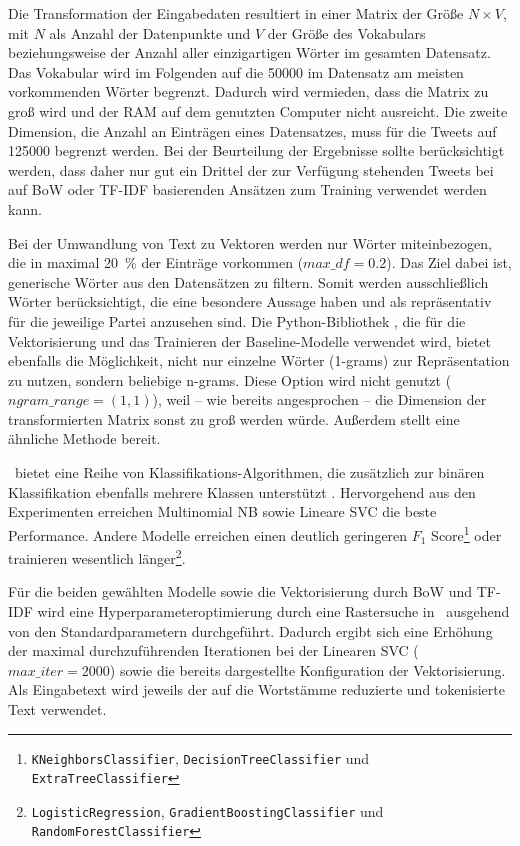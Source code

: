 Die Transformation der Eingabedaten resultiert in einer Matrix der Größe \(N \times V\), mit \(N\) als Anzahl der Datenpunkte und \(V\) der Größe des Vokabulars beziehungsweise der Anzahl aller einzigartigen Wörter im gesamten Datensatz. Das Vokabular wird im Folgenden auf die \num{50000} im Datensatz am meisten vorkommenden Wörter begrenzt. Dadurch wird vermieden, dass die Matrix zu groß wird und der \ac{RAM} auf dem genutzten Computer nicht ausreicht. Die zweite Dimension, die Anzahl an Einträgen eines Datensatzes, muss für die Tweets auf \num{125000} begrenzt werden. Bei der Beurteilung der Ergebnisse sollte berücksichtigt werden, dass daher nur gut ein Drittel der zur Verfügung stehenden Tweets bei auf \ac{BoW} oder \ac{TF-IDF} basierenden Ansätzen zum Training verwendet werden kann.

Bei der Umwandlung von Text zu Vektoren werden nur Wörter miteinbezogen, die in maximal \SI{20}{\percent} der Einträge vorkommen (\(max\_df = \num{0.2}\)). Das Ziel dabei ist, generische Wörter aus den Datensätzen zu filtern. Somit werden ausschließlich Wörter berücksichtigt, die eine besondere Aussage haben und als repräsentativ für die jeweilige Partei anzusehen sind. Die Python-Bibliothek \sk, die für die Vektorisierung und das Trainieren der Baseline-Modelle verwendet wird, bietet ebenfalls die Möglichkeit, nicht nur einzelne Wörter (1-grams) zur Repräsentation zu nutzen, sondern beliebige n-grams. Diese Option wird nicht genutzt (\(ngram\_range = (\num{1}, \num{1})\)), weil -- wie bereits angesprochen -- die Dimension der transformierten Matrix sonst zu groß werden würde. Außerdem stellt \ft eine ähnliche Methode bereit.

\sk~bietet eine Reihe von Klassifikations-Algorithmen, die zusätzlich zur binären Klassifikation ebenfalls mehrere Klassen unterstützt \autocite{noauthor_112_nodate}. Hervorgehend aus den Experimenten erreichen Multinomial \ac{NB} sowie Lineare \ac{SVC} die beste Performance. Andere Modelle erreichen einen deutlich geringeren \(F_1\) Score\footnote{\texttt{KNeighborsClassifier}, \texttt{DecisionTreeClassifier} und \texttt{ExtraTreeClassifier}} oder trainieren wesentlich länger\footnote{\texttt{LogisticRegression}, \texttt{GradientBoostingClassifier} und \texttt{RandomForestClassifier}}.

Für die beiden gewählten Modelle sowie die Vektorisierung durch \ac{BoW} und \ac{TF-IDF} wird eine Hyperparameteroptimierung durch eine Rastersuche in \sk~ausgehend von den Standardparametern durchgeführt. Dadurch ergibt sich eine Erhöhung der maximal durchzuführenden Iterationen bei der Linearen \ac{SVC} (\(max\_iter = \num{2000}\)) sowie die bereits dargestellte Konfiguration der Vektorisierung. Als Eingabetext wird jeweils der auf die Wortstämme reduzierte und tokenisierte Text verwendet.

